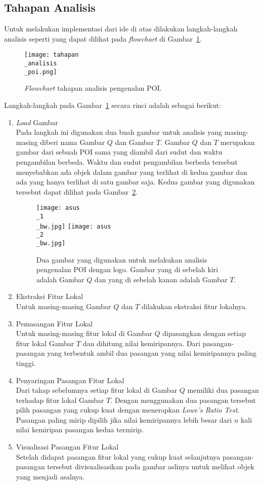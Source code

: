 \subsection{Tahapan Analisis}  
Untuk melakukan implementasi dari ide di atas dilakukan langkah-langkah analisis seperti yang dapat dilihat pada \textit{flowchart} di Gambar~\ref{fig:tahapan_analisis_poi}.

\begin{figure}[H]
	\centering
	\texttt{[image: tahapan\\\_analisis\\\_poi.png]}
	\caption{\textit{Flowchart} tahapan analisis pengenalan POI.}
	\label{fig:tahapan_analisis_poi}
\end{figure}

Langkah-langkah pada Gambar~\ref{fig:tahapan_analisis_poi} secara rinci adalah sebagai berikut:
\begin{enumerate}
	\item \textit{Load} Gambar \\
	Pada langkah ini digunakan dua buah gambar untuk analisis yang masing-masing diberi nama Gambar $Q$ dan Gambar $T$. Gambar $Q$ dan $T$ merupakan gambar dari sebuah POI sama yang diambil dari sudut dan waktu pengambilan berbeda. Waktu dan sudut pengambilan berbeda tersebut menyebabkan ada objek dalam gambar yang terlihat di kedua gambar dan ada yang hanya terlihat di satu gambar saja. Kedua gambar yang digunakan tersebut dapat dilihat pada Gambar~\ref{fig:analisis_asus}.
	\begin{figure}[H]
		\centering
		\texttt{[image: asus\\\_1\\\_bw.jpg]}
		\texttt{[image: asus\\\_2\\\_bw.jpg]}
		\caption{Dua gambar yang digunakan untuk melakukan analisis pengenalan POI dengan logo. Gambar yang di sebelah kiri adalah Gambar $Q$ dan yang di sebelah kanan adalah Gambar $T$.}
		\label{fig:analisis_asus}
	\end{figure}
	\item Ekstraksi Fitur Lokal \\
	Untuk masing-masing Gambar $Q$ dan $T$ dilakukan ekstraksi fitur lokalnya.
	\item Pemasangan Fitur Lokal \\
	Untuk masing-masing fitur lokal di Gambar $Q$ dipasangkan dengan setiap fitur lokal Gambar $T$ dan dihitung nilai kemiripannya. Dari pasangan-pasangan yang terbentuk ambil dua pasangan yang nilai kemiripannya paling tinggi.
	\item Penyaringan Pasangan Fitur Lokal \\
	Dari tahap sebelumnya setiap fitur lokal di Gambar $Q$ memiliki dua pasangan terhadap fitur lokal Gambar $T$. Dengan menggunakan dua pasangan tersebut pilih pasangan yang cukup kuat dengan menerapkan \textit{Lowe's Ratio Test}. Pasangan paling mirip dipilih jika nilai kemiripannya lebih besar dari $n$ kali nilai kemiripan pasangan kedua termirip.
	\item Visualisasi Pasangan Fitur Lokal \\
	Setelah didapat pasangan fitur lokal yang cukup kuat selanjutnya pasangan-pasangan tersebut divisualisasikan pada gambar aslinya untuk melihat objek yang menjadi asalnya.
\end{enumerate}

